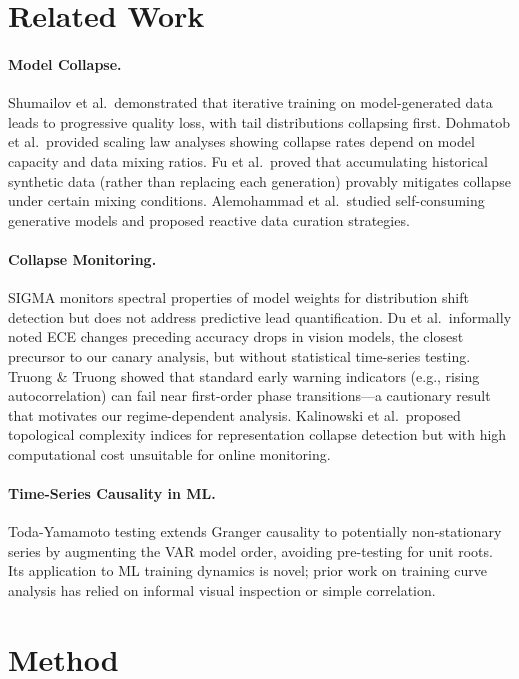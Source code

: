 \documentclass[letterpaper,11pt]{article}
\begin{document}
\section{Related Work}

\paragraph{Model Collapse.}
Shumailov et al.\ demonstrated that iterative training on model-generated data leads to progressive quality loss, with tail distributions collapsing first.
Dohmatob et al.\ provided scaling law analyses showing collapse rates depend on model capacity and data mixing ratios.
Fu et al.\ proved that accumulating historical synthetic data (rather than replacing each generation) provably mitigates collapse under certain mixing conditions.
Alemohammad et al.\ studied self-consuming generative models and proposed reactive data curation strategies.

\paragraph{Collapse Monitoring.}
SIGMA monitors spectral properties of model weights for distribution shift detection but does not address predictive lead quantification.
Du et al.\ informally noted ECE changes preceding accuracy drops in vision models, the closest precursor to our canary analysis, but without statistical time-series testing.
Truong \& Truong showed that standard early warning indicators (e.g., rising autocorrelation) can fail near first-order phase transitions---a cautionary result that motivates our regime-dependent analysis.
Kalinowski et al.\ proposed topological complexity indices for representation collapse detection but with high computational cost unsuitable for online monitoring.

\paragraph{Time-Series Causality in ML.}
Toda-Yamamoto testing extends Granger causality to potentially non-stationary series by augmenting the VAR model order, avoiding pre-testing for unit roots.
Its application to ML training dynamics is novel; prior work on training curve analysis has relied on informal visual inspection or simple correlation.

\section{Method}
\end{document}
